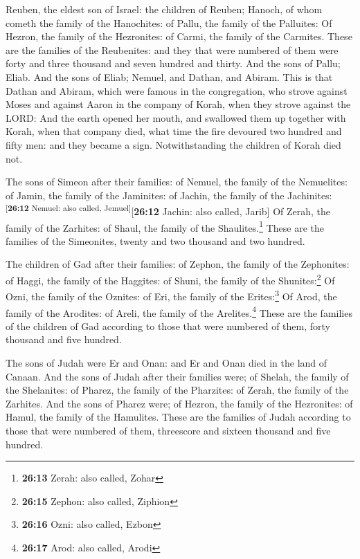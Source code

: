  Reuben, the eldest son of Israel: the children of Reuben;
Hanoch, of whom cometh the family of the Hanochites: of Pallu, the
family of the Palluites:  Of Hezron, the family of the
Hezronites: of Carmi, the family of the Carmites.  These
are the families of the Reubenites: and they that were numbered of them
were forty and three thousand and seven hundred and thirty.
 And the sons of Pallu; Eliab.  And the sons
of Eliab; Nemuel, and Dathan, and Abiram. This is that Dathan and
Abiram, which were famous in the congregation, who strove against Moses
and against Aaron in the company of Korah, when they strove against the
LORD:  And the earth opened her mouth, and swallowed them
up together with Korah, when that company died, what time the fire
devoured two hundred and fifty men: and they became a sign.
 Notwithstanding the children of Korah died not.

 The sons of Simeon after their families: of Nemuel, the
family of the Nemuelites: of Jamin, the family of the Jaminites: of
Jachin, the family of the Jachinites:\textsuperscript{{[}\textbf{26:12}
Nemuel: also called, Jemuel{]}}{[}\textbf{26:12} Jachin: also called,
Jarib{]}  Of Zerah, the family of the Zarhites: of Shaul,
the family of the Shaulites.\footnote{\textbf{26:13} Zerah: also called,
  Zohar}  These are the families of the Simeonites,
twenty and two thousand and two hundred.

 The children of Gad after their families: of Zephon, the
family of the Zephonites: of Haggi, the family of the Haggites: of
Shuni, the family of the Shunites:\footnote{\textbf{26:15} Zephon: also
  called, Ziphion}  Of Ozni, the family of the Oznites:
of Eri, the family of the Erites:\footnote{\textbf{26:16} Ozni: also
  called, Ezbon}  Of Arod, the family of the Arodites: of
Areli, the family of the Arelites.\footnote{\textbf{26:17} Arod: also
  called, Arodi}  These are the families of the children
of Gad according to those that were numbered of them, forty thousand and
five hundred.

 The sons of Judah were Er and Onan: and Er and Onan died
in the land of Canaan.  And the sons of Judah after their
families were; of Shelah, the family of the Shelanites: of Pharez, the
family of the Pharzites: of Zerah, the family of the Zarhites.
 And the sons of Pharez were; of Hezron, the family of
the Hezronites: of Hamul, the family of the Hamulites. 
These are the families of Judah according to those that were numbered of
them, threescore and sixteen thousand and five hundred.


